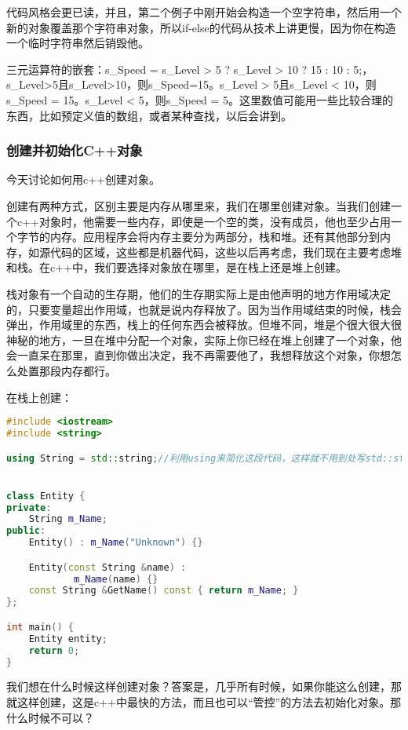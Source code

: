 代码风格会更已读，并且，第二个例子中刚开始会构造一个空字符串，然后用一个新的对象覆盖那个字符串对象，所以{\ncodestyle if-else}的代码从技术上讲更慢，因为你在构造一个临时字符串然后销毁他。

三元运算符的嵌套：{\ncodestyle s_Speed = s_Level > 5 ? s_Level > 10 ? 15 : 10 : 5;}，s_Level>5且s_Level>10，则s_Speed=15。s_Level > 5且s_Level < 10，则s_Speed = 15。s_Level < 5，则s_Speed = 5。这里数值可能用一些比较合理的东西，比如预定义值的数组，或者某种查找，以后会讲到。


\subsubsection{创建并初始化C++对象}

今天讨论如何用c++创建对象。

创建有两种方式，区别主要是内存从哪里来，我们在哪里创建对象。当我们创建一个c++对象时，他需要一些内存，即使是一个空的类，没有成员，他也至少占用一个字节的内存。应用程序会将内存主要分为两部分，栈和堆。还有其他部分到内存，如源代码的区域，这些都是机器代码，这些以后再考虑，我们现在主要考虑堆和栈。在c++中，我们要选择对象放在哪里，是在栈上还是堆上创建。

栈对象有一个自动的生存期，他们的生存期实际上是由他声明的地方作用域决定的，只要变量超出作用域，也就是说内存释放了。因为当作用域结束的时候，栈会弹出，作用域里的东西，栈上的任何东西会被释放。但堆不同，堆是个很大很大很神秘的地方，一旦在堆中分配一个对象，实际上你已经在堆上创建了一个对象，他会一直呆在那里，直到你做出决定，我不再需要他了，我想释放这个对象，你想怎么处置那段内存都行。

在栈上创建：

\begin{lstlisting}[language=c++]
#include <iostream>
#include <string>

using String = std::string;//利用using来简化这段代码，这样就不用到处写std::string了


class Entity {
private:
    String m_Name;
public:
    Entity() : m_Name("Unknown") {}

    Entity(const String &name) :
            m_Name(name) {}
    const String &GetName() const { return m_Name; }
};

int main() {
    Entity entity;
    return 0;
}
\end{lstlisting}

我们想在什么时候这样创建对象？答案是，几乎所有时候，如果你能这么创建，那就这样创建，这是c++中最快的方法，而且也可以“管控”的方法去初始化对象。那什么时候不可以？

